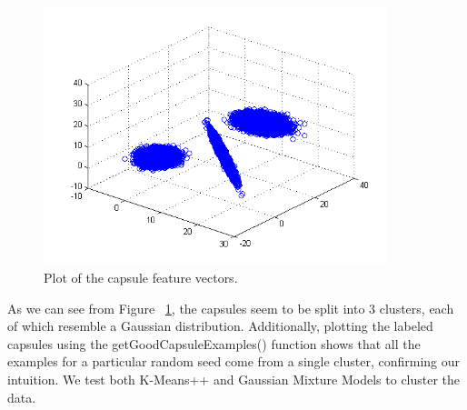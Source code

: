 \documentclass[11pt]{amsart}
\begin{document}
\begin{figure}[h]
	\includegraphics[width=10cm]{capsuleCluster.png}
	\caption{Plot of the capsule feature vectors.}
	\label{fig:capsules}
\end{figure}

As we can see from Figure ~\ref{fig:capsules}, the capsules seem to be split into 3 clusters, each of which resemble a Gaussian distribution. Additionally, plotting the labeled capsules using the getGoodCapsuleExamples() function shows that all the examples for a particular random seed come from a single cluster, confirming our intuition. We test both K-Means++ and Gaussian Mixture Models to cluster the data.
\end{document}
